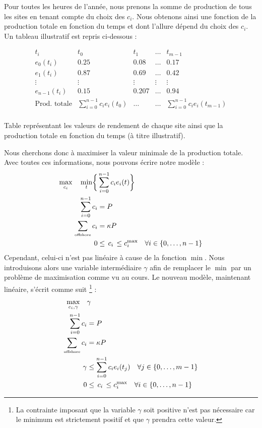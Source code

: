 \documentclass{article}
\newlength{\temp}
\begin{document}
Pour toutes les heures de l'année, nous prenons la somme de production de tous les sites en tenant compte du choix des $c_i$. Nous obtenons ainsi une fonction de la production totale en fonction du temps et dont l'allure dépend du choix des $c_i$.
Un tableau illustratif est repris ci-dessous :
\begin{table}[h!]
\centering
    \[ \begin{array}{c|cccc}
      t_i    & {t_0} & {t_1} & {\ldots}  & {t_{m-1}}\\
      \hline
      e_0(t_i) & 0.25       & 0.08   &\ldots    & 0.17 \\
      e_1(t_i) & 0.87       & 0.69   &\ldots    & 0.42 \\
      \vdots   & \vdots     & \vdots  &\vdots   & \vdots \\
      e_{n-1}(t_i) & 0.15       & 0.207   &\ldots    & 0.94 \\
      \hline
      \text{Prod. totale} &\scriptstyle \sum \limits_{i=0}^{n-1}c_i e_i(t_0) &\ldots &\ldots &\scriptstyle \sum \limits_{i=0}^{n-1}c_i e_i(t_{m-1})\\
    \end{array} \]
\caption{Table représentant les valeurs de rendement de chaque site ainsi que la production totale en fonction du temps (à titre illustratif).}
\label{table:table_rendement_illustratif}
\end{table}
\newpage
Nous cherchons donc à maximiser la valeur minimale de la production totale. Avec toutes ces informations, nous pouvons écrire notre modèle :
\begin{align*}
    \max_{c_i} \quad  
    \min_t  \biggl\{ &\sum_{i=0}^{n-1}c_i e_i(t) \biggl\} \\ 
    \sum_{i=0}^{n-1} c_i &= P\\
    \sum_{\text{\tiny offshore}}c_i &= \kappa P\\
    0 &\le \, c_i \, \le c_i^{\max} \quad \forall i \in \{0, \ldots, n-1\}
\end{align*}
Cependant, celui-ci n'est pas linéaire à cause de la fonction $\min$. Nous introduisons alors une variable intermédiaire $\gamma$ afin de remplacer le $\min$ par un problème de maximisation comme vu au cours. Le nouveau modèle, maintenant linéaire, s'écrit comme suit \footnote{La contrainte imposant que la variable $\gamma$ soit positive n'est pas nécessaire car le minimum est strictement positif et que $\gamma$ prendra cette valeur.} :
\begin{align}
    \max_{c_i, \gamma} \quad &\gamma \nonumber \\ 
    \sum_{i=0}^{n-1} c_i &= P\\
    \sum_{\text{\tiny offshore}}c_i &= \kappa P\\
    \gamma &\le \sum_{i=0}^{n-1} c_i e_i(t_j) \quad \forall j \in \{0, \ldots, m-1\}\\
    0 &\le \, c_i \, \le c_i^{\max} \quad \forall i \in \{0, \ldots, n-1\}
\end{align}
\end{document}
